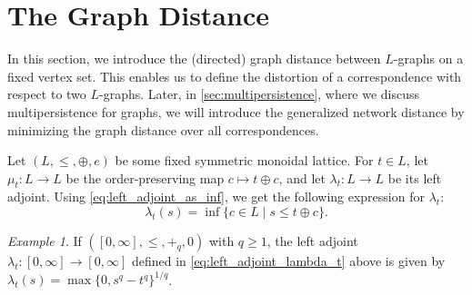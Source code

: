 \documentclass[a4paper,11pt]{article}
\newcommand{\atensor}{\oplus}
\newcounter{dummy}\numberwithin{dummy}{section}
\theoremstyle{remark}
\newtheorem{example}[dummy]{Example}
\begin{document}
\section{The Graph Distance}\label{sec:directed_graph_distance}
In this section, we introduce the (directed) graph distance between $L$-graphs on a fixed vertex set. This enables us to define the distortion of a correspondence with respect to two $L$-graphs. Later, in \cref{sec:multipersistence}, where we discuss multipersistence for graphs, we will introduce the generalized network distance by minimizing the graph distance over all correspondences.

Let $(L,\leq,\atensor,e)$ be some fixed symmetric monoidal lattice. For $t\in L$, let $\mu_t\colon L\to L$ be the order-preserving map $c\mapsto t\atensor c$, and let $\lambda_t\colon L\to L$ be its left adjoint. Using \cref{eq:left_adjoint_as_inf}, we get the following expression for $\lambda_t$:
\begin{equation}\label{eq:left_adjoint_lambda_t}
    \lambda_t(s)=\inf\{c\in L\mid s\leq t\atensor c\}.
\end{equation}

\begin{example}\label{ex:left_adjoint_q_sum}
If $([0,\infty],\leq,+_q,0)$ with $q\geq1$, the left adjoint $\lambda_t\colon [0,\infty]\to[0,\infty]$ defined in \cref{eq:left_adjoint_lambda_t} above is given by $\lambda_t(s)=\max\{0,s^q-t^q\}^{1/q}$.
\end{example}
\end{document}

